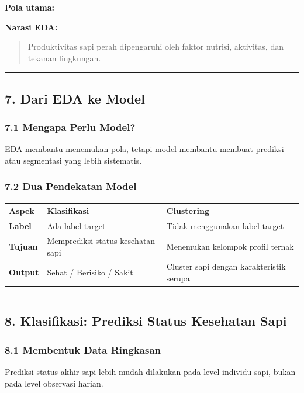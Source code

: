\documentclass[12pt,a4paper]{article}
\begin{document}
\textbf{Pola utama:}


\textbf{Narasi EDA:}


\begin{quote}
Produktivitas sapi perah dipengaruhi oleh faktor nutrisi, aktivitas, dan tekanan lingkungan.\end{quote}


\hrule


\subsection{7. Dari EDA ke Model}

\subsubsection{7.1 Mengapa Perlu Model?}

EDA membantu menemukan pola, tetapi model membantu membuat prediksi atau segmentasi yang lebih sistematis.


\subsubsection{7.2 Dua Pendekatan Model}

\begin{tabular}{|l|l|l|}
\hline
Aspek & Klasifikasi & Clustering \\
\hline
\textbf{Label} & Ada label target & Tidak menggunakan label target \\
\hline
\textbf{Tujuan} & Memprediksi status kesehatan sapi & Menemukan kelompok profil ternak \\
\hline
\textbf{Output} & Sehat / Berisiko / Sakit & Cluster sapi dengan karakteristik serupa \\
\hline
\end{tabular}


\hrule


\subsection{8. Klasifikasi: Prediksi Status Kesehatan Sapi}

\subsubsection{8.1 Membentuk Data Ringkasan}

Prediksi status akhir sapi lebih mudah dilakukan pada level individu sapi, bukan pada level observasi harian.
\end{document}
